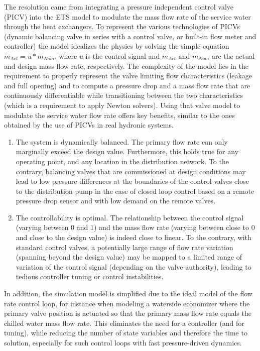 The resolution came from integrating a pressure independent control valve (PICV) into the ETS model to modulate the mass flow rate of the service water through the heat exchangers.
To represent the various technologies of PICVs (dynamic balancing valve in series with a control valve, or built-in flow meter and controller) the model idealizes the physics by solving the simple equation $ \dot{m}_{Act} = u * \dot{m}_{Nom} $, where $u$ is the control signal and $\dot{m}_{Act}$ and $\dot{m}_{Nom}$ are the actual and design mass flow rate, respectively.
The complexity of the model lies in the requirement to properly represent the valve limiting flow characteristics (leakage and full opening) and to compute a pressure drop and a mass flow rate that are continuously differentiable while transitioning between the two characteristics (which is a requirement to apply Newton solvers).
Using that valve model to modulate the service water flow rate offers  key benefits, similar to the ones obtained by the use of PICVs in real hydronic systems.
\begin{enumerate}
    \item The system is dynamically balanced. The primary flow rate can only marginally exceed the design value. Furthermore, this holds true for any operating point, and any location in the distribution network. To the contrary, balancing valves that are commissioned at design conditions may lead to low pressure differences at the boundaries of the control valves close to the distribution pump in the case of closed loop control based on a remote pressure drop sensor and with low demand on the remote valves.
    \item The controllability is optimal. The relationship between the control signal (varying between $0$ and $1$) and the mass flow rate (varying between close to $0$ and close to the design value) is indeed close to linear. To the contrary, with standard control valves, a potentially large range of flow rate variation (spanning beyond the design value) may be mapped to a limited range of variation of the control signal (depending on the valve authority), leading to tedious controller tuning or control instabilities.
\end{enumerate}

In addition, the simulation model is simplified due to the ideal model of the flow rate control loop, for instance when modeling a waterside economizer where the primary valve position is actuated so that the primary mass flow rate equals the chilled water mass flow rate. This eliminates the need for a controller (and for tuning), while reducing the number of state variables and therefore the time to solution, especially for such control loops with fast pressure-driven dynamics.

